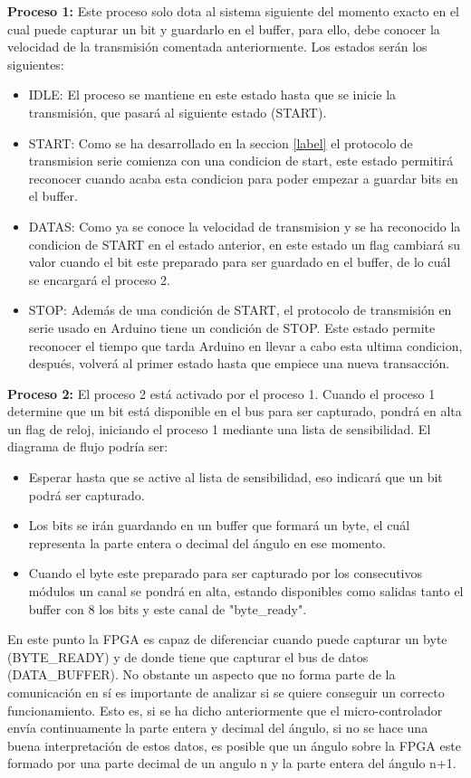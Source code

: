 \textbf{Proceso 1:} Este proceso solo dota al sistema siguiente del momento exacto en el cual puede capturar un bit y guardarlo en el buffer, para ello, debe conocer la velocidad de la transmisión comentada anteriormente. Los estados serán los siguientes: 

\begin{itemize}
	\item IDLE: El proceso se mantiene en este estado hasta que se inicie la transmisión, que pasará al siguiente estado (START).
	\item START: Como se ha desarrollado en la seccion \ref{label} el protocolo de transmision serie comienza con una condicion de start, este estado permitirá reconocer cuando acaba esta condicion para poder empezar a guardar bits en el buffer. 
	\item DATAS: Como ya se conoce la velocidad de transmision y se ha reconocido la condicion de START en el estado anterior, en este estado un flag cambiará su valor cuando el bit este preparado para ser guardado en el buffer, de lo cuál se encargará el proceso 2.
	\item STOP: Además de una condición de START, el protocolo de transmisión en serie usado en Arduino tiene un condición de STOP. Este estado permite reconocer el tiempo que tarda Arduino en llevar a cabo esta ultima condicion, después, volverá al primer estado hasta que empiece una nueva transacción.
\end{itemize}

\textbf{Proceso 2:} El proceso 2 está activado por el proceso 1. Cuando el proceso 1 determine que un bit está disponible en el bus para ser capturado, pondrá en alta un flag de reloj, iniciando el proceso 1 mediante una lista de sensibilidad. El diagrama de flujo podría ser:

\begin{itemize}
	\item Esperar hasta que se active al lista de sensibilidad, eso indicará que un bit podrá ser capturado.
	\item Los bits se irán guardando en un buffer que formará un byte, el cuál representa la parte entera o decimal del ángulo en ese momento.
	\item Cuando el byte este preparado para ser capturado por los consecutivos módulos un canal se pondrá en alta, estando disponibles como salidas tanto el buffer con 8 los bits y este canal de "byte\_ready".
\end{itemize}

En este punto la FPGA es capaz de diferenciar cuando puede capturar un byte (BYTE\_READY) y de donde tiene que capturar el bus de datos (DATA\_BUFFER). No obstante un aspecto que no forma parte de la comunicación en sí es importante de analizar si se quiere conseguir un correcto funcionamiento. Esto es, si se ha dicho anteriormente que el micro-controlador envía continuamente la parte entera y decimal del ángulo, si no se hace una buena interpretación de estos datos, es posible que un ángulo sobre la FPGA este formado por una parte decimal de un angulo n y la parte entera del ángulo n+1. \newline


